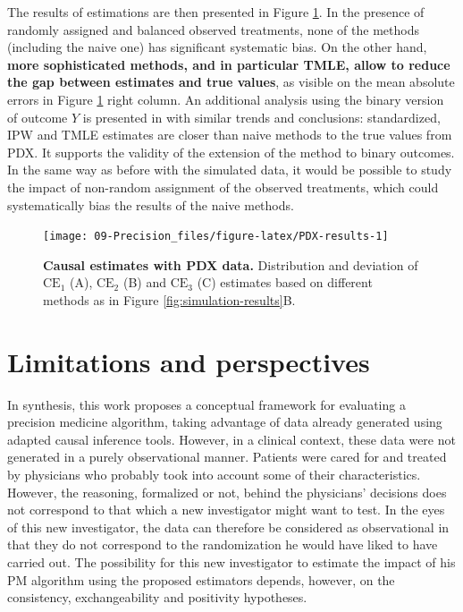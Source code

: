 \documentclass[a4paper,12pt,twoside,onecolumn,openright,final,oldfontcommands]{memoir}
\begin{document}
The results of estimations are then presented in Figure
\ref{fig:PDX-results}. In the presence of randomly assigned and balanced
observed treatments, none of the methods (including the naive one) has
significant systematic bias. On the other hand, \textbf{more
sophisticated methods, and in particular TMLE, allow to reduce the gap
between estimates and true values}, as visible on the mean absolute
errors in Figure \ref{fig:PDX-results} right column. An additional
analysis using the binary version of outcome \(Y\) is presented in
\citet{beal2020causal} with similar trends and conclusions:
standardized, IPW and TMLE estimates are closer than naive methods to
the true values from PDX. It supports the validity of the extension of
the method to binary outcomes. In the same way as before with the
simulated data, it would be possible to study the impact of non-random
assignment of the observed treatments, which could systematically bias
the results of the naive methods.

\begin{figure}

{\centering \texttt{[image: 09-Precision\_files/figure-latex/PDX-results-1]} 

}

\caption[Causal estimates with PDX data]{\textbf{Causal estimates with PDX data.}
Distribution and deviation of \(\text{CE}_1\) (A), \(\text{CE}_2\) (B)
and \(\text{CE}_3\) (C) estimates based on different methods as in
Figure \ref{fig:simulation-results}B.}\label{fig:PDX-results}
\end{figure}






\section{Limitations and perspectives}\label{part3-limits}

In synthesis, this work proposes a conceptual framework for evaluating a
precision medicine algorithm, taking advantage of data already generated
using adapted causal inference tools. However, in a clinical context,
these data were not generated in a purely observational manner. Patients
were cared for and treated by physicians who probably took into account
some of their characteristics. However, the reasoning, formalized or
not, behind the physicians' decisions does not correspond to that which
a new investigator might want to test. In the eyes of this new
investigator, the data can therefore be considered as observational in
that they do not correspond to the randomization he would have liked to
have carried out. The possibility for this new investigator to estimate
the impact of his PM algorithm using the proposed estimators depends,
however, on the consistency, exchangeability and positivity hypotheses.
\end{document}
